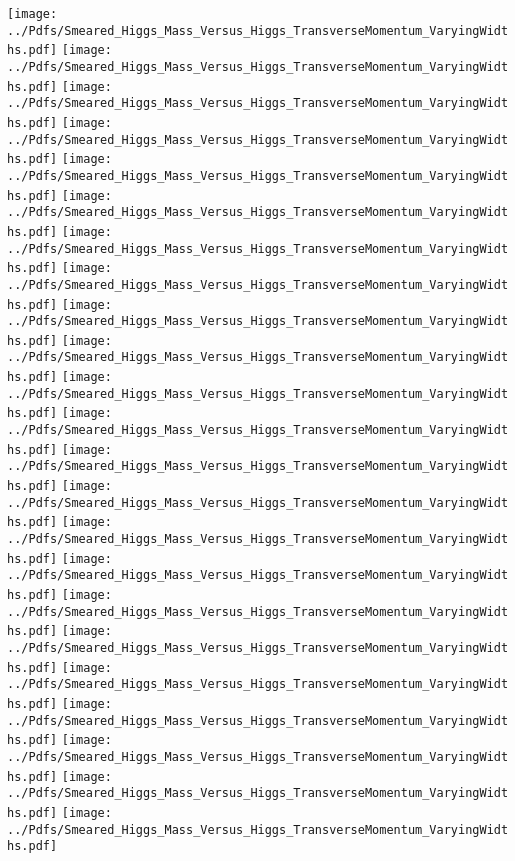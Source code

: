 \documentclass[a4wide,10pt]{article}
\begin{document}
\texttt{[image: ../Pdfs/Smeared\_Higgs\_Mass\_Versus\_Higgs\_TransverseMomentum\_VaryingWidths.pdf]}
\texttt{[image: ../Pdfs/Smeared\_Higgs\_Mass\_Versus\_Higgs\_TransverseMomentum\_VaryingWidths.pdf]}
\texttt{[image: ../Pdfs/Smeared\_Higgs\_Mass\_Versus\_Higgs\_TransverseMomentum\_VaryingWidths.pdf]}
\texttt{[image: ../Pdfs/Smeared\_Higgs\_Mass\_Versus\_Higgs\_TransverseMomentum\_VaryingWidths.pdf]}
\texttt{[image: ../Pdfs/Smeared\_Higgs\_Mass\_Versus\_Higgs\_TransverseMomentum\_VaryingWidths.pdf]}
\texttt{[image: ../Pdfs/Smeared\_Higgs\_Mass\_Versus\_Higgs\_TransverseMomentum\_VaryingWidths.pdf]}
\texttt{[image: ../Pdfs/Smeared\_Higgs\_Mass\_Versus\_Higgs\_TransverseMomentum\_VaryingWidths.pdf]}
\texttt{[image: ../Pdfs/Smeared\_Higgs\_Mass\_Versus\_Higgs\_TransverseMomentum\_VaryingWidths.pdf]}
\texttt{[image: ../Pdfs/Smeared\_Higgs\_Mass\_Versus\_Higgs\_TransverseMomentum\_VaryingWidths.pdf]}
\texttt{[image: ../Pdfs/Smeared\_Higgs\_Mass\_Versus\_Higgs\_TransverseMomentum\_VaryingWidths.pdf]}
\texttt{[image: ../Pdfs/Smeared\_Higgs\_Mass\_Versus\_Higgs\_TransverseMomentum\_VaryingWidths.pdf]}
\texttt{[image: ../Pdfs/Smeared\_Higgs\_Mass\_Versus\_Higgs\_TransverseMomentum\_VaryingWidths.pdf]}
\texttt{[image: ../Pdfs/Smeared\_Higgs\_Mass\_Versus\_Higgs\_TransverseMomentum\_VaryingWidths.pdf]}
\texttt{[image: ../Pdfs/Smeared\_Higgs\_Mass\_Versus\_Higgs\_TransverseMomentum\_VaryingWidths.pdf]}
\texttt{[image: ../Pdfs/Smeared\_Higgs\_Mass\_Versus\_Higgs\_TransverseMomentum\_VaryingWidths.pdf]}
\texttt{[image: ../Pdfs/Smeared\_Higgs\_Mass\_Versus\_Higgs\_TransverseMomentum\_VaryingWidths.pdf]}
\texttt{[image: ../Pdfs/Smeared\_Higgs\_Mass\_Versus\_Higgs\_TransverseMomentum\_VaryingWidths.pdf]}
\texttt{[image: ../Pdfs/Smeared\_Higgs\_Mass\_Versus\_Higgs\_TransverseMomentum\_VaryingWidths.pdf]}
\texttt{[image: ../Pdfs/Smeared\_Higgs\_Mass\_Versus\_Higgs\_TransverseMomentum\_VaryingWidths.pdf]}
\texttt{[image: ../Pdfs/Smeared\_Higgs\_Mass\_Versus\_Higgs\_TransverseMomentum\_VaryingWidths.pdf]}
\texttt{[image: ../Pdfs/Smeared\_Higgs\_Mass\_Versus\_Higgs\_TransverseMomentum\_VaryingWidths.pdf]}
\texttt{[image: ../Pdfs/Smeared\_Higgs\_Mass\_Versus\_Higgs\_TransverseMomentum\_VaryingWidths.pdf]}
\texttt{[image: ../Pdfs/Smeared\_Higgs\_Mass\_Versus\_Higgs\_TransverseMomentum\_VaryingWidths.pdf]}
\end{document}
